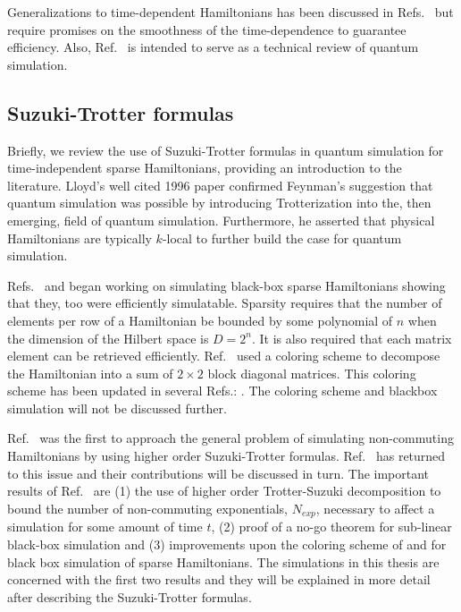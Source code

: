 \documentclass[11pt,oneside,final]{huthesis}%
\begin{document}
Generalizations to time-dependent Hamiltonians has been discussed in Refs.~\cite{Poulin11,Wiebe11} but require promises on the smoothness of the time-dependence to guarantee efficiency.  Also, Ref.~\cite{Wiebe11} is intended to serve as a technical review of quantum simulation.


\subsection{Suzuki-Trotter formulas}




Briefly, we review the use of Suzuki-Trotter formulas in quantum simulation for time-independent sparse Hamiltonians, providing an introduction to the literature.  Lloyd's well cited 1996 paper \cite{Lloyd96} confirmed Feynman's suggestion that quantum simulation was possible by introducing Trotterization into the, then emerging, field of quantum simulation.  Furthermore, he asserted that physical Hamiltonians are typically $k$-local to further build the case for quantum simulation. 

Refs.~\cite{Aharonov08} and \cite{Childs04} began working on simulating black-box sparse Hamiltonians showing that they, too were efficiently simulatable.  Sparsity requires that the number of elements per row of a Hamiltonian be bounded by some polynomial of $n$ when the dimension of the Hilbert space is  $D=2^n$. It is also required that each matrix element can be retrieved efficiently. Ref.~\cite{Aharonov08} used a coloring scheme to decompose the Hamiltonian into a sum of $2\times2$ block diagonal matrices.  This coloring scheme has been updated in several Refs.: \cite{Berry07,Berry09,Childs11}.  The coloring scheme and blackbox simulation will not be discussed further.

Ref.~\cite{Berry07} was the first to approach the general problem of simulating non-commuting Hamiltonians by using higher order Suzuki-Trotter formulas.  Ref.~\cite{Papageorgiou10} has returned to this issue and their contributions will be discussed in turn.  The important results of Ref.~\cite{Berry07} are (1) the use of higher order Trotter-Suzuki decomposition to bound the number of non-commuting exponentials,  $N_{exp}$, necessary to affect a simulation for some amount of time $t$, (2) proof of a no-go theorem for sub-linear black-box simulation and (3) improvements upon the coloring scheme of \cite{Aharonov08} and \cite{Childs04} for black box simulation of sparse Hamiltonians.  The simulations in this thesis are concerned with the first two results and they will be explained in more detail after describing the Suzuki-Trotter formulas. 
\end{document}
